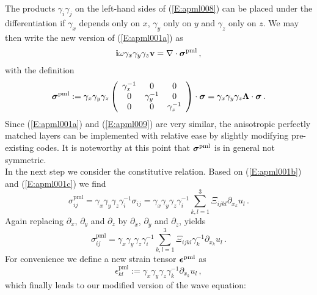 The products $\gamma_i \gamma_j$ on the left-hand sides of
(\ref{E:apml008}) can be placed under the differentiation if
$\gamma_x$ depends only on $x$, $\gamma_y$ only on $y$ and
$\gamma_z$ only on $z$. We may then write the new version of
(\ref{E:apml001a}) as
\begin{equation}\label{E:apml009}
\mathbf{i}\omega \gamma_x \gamma_y \gamma_z \mathbf{v} = \nabla\cdot
\boldsymbol{\sigma}^{\text{pml}}\,,
\end{equation}
with the definition
\begin{equation}\label{E:apml010}
\boldsymbol{\sigma}^{\text{pml}} := \gamma_x \gamma_y \gamma_z \left(
  \begin{array}{ccc}
    \gamma_x^{-1} & 0 & 0 \\
    0 & \gamma_y^{-1} & 0 \\
    0 & 0 & \gamma_z^{-1} \\
  \end{array}
\right) \cdot \boldsymbol{\sigma} = \gamma_x \gamma_y \gamma_z
\boldsymbol{\Lambda}\cdot\boldsymbol{\sigma}\,.
\end{equation}
Since (\ref{E:apml001a}) and (\ref{E:apml009}) are very similar, the
anisotropic perfectly matched layers can be implemented with
relative ease by slightly modifying pre-existing codes. It is
noteworthy at this point that $\boldsymbol{\sigma}^{\text{pml}}$ is in
general not symmetric.\\
In the next step we consider the constitutive relation. Based on
(\ref{E:apml001b}) and (\ref{E:apml001c}) we find
\begin{equation}\label{E:apml011}
\sigma_{ij}^{\text{pml}} = \gamma_x \gamma_y \gamma_z \gamma_i^{-1}
\sigma_{ij} = \gamma_x \gamma_y \gamma_z \gamma_i^{-1}
\sum_{k,l=1}^{3} \Xi_{ijkl} \partial_{x_k} u_l\,.
\end{equation}
Again replacing $\partial_x$, $\partial_y$ and $\partial_z$ by
$\partial_{\tilde{x}}$, $\partial_{\tilde{y}}$ and
$\partial_{\tilde{z}}$, yields
\begin{equation}\label{E:apml012}
\sigma_{ij}^{\text{pml}}=  \gamma_x \gamma_y \gamma_z \gamma_i^{-1}
\sum_{k,l=1}^{3} \Xi_{ijkl} \gamma_k^{-1} \partial_{x_k} u_l\,.
\end{equation}
For convenience we define a new strain tensor
$\boldsymbol{\epsilon}^{\text{pml}}$ as
\begin{equation}\label{E:apml013}
\epsilon_{kl}^{\text{pml}} :=  \gamma_x \gamma_y \gamma_z
\gamma_k^{-1} \partial_{x_k} u_l\,,
\end{equation}
which finally leads to our modified version of the wave equation:
